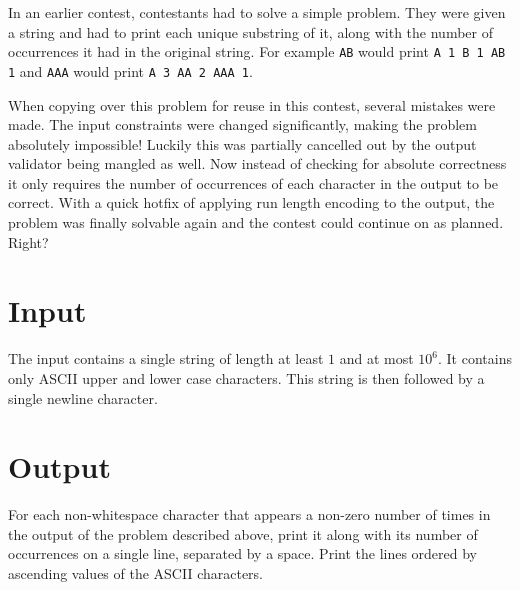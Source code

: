 
In an earlier contest, contestants had to solve a simple
problem. They were given a string and had to print each
unique substring of it, along with the number of occurrences
it had in the original string. For example \texttt{AB}
would print \texttt{A 1 B 1 AB 1} and \texttt{AAA} would
print \texttt{A 3 AA 2 AAA 1}.

When copying over this problem for reuse in this contest,
several mistakes were made. The input constraints were changed
significantly, making the problem absolutely impossible!
Luckily this was partially cancelled out by the output
validator being mangled as well. Now instead of checking
for absolute correctness it only requires the number of
occurrences of each character in the output to be correct.
With a quick hotfix of applying run length encoding to the
output, the problem was finally solvable again and the
contest could continue on as planned. Right?

\section*{Input}

The input contains a single string of length at least $1$
and at most $10^6$. It contains only ASCII upper and lower
case characters. This string is then followed by a single
newline character.

\section*{Output}

For each non-whitespace character that appears a non-zero 
number of times in the output of the problem described above,
print it along with its number of occurrences on a single 
line, separated by a space. Print the lines ordered by 
ascending values of the ASCII characters. 
